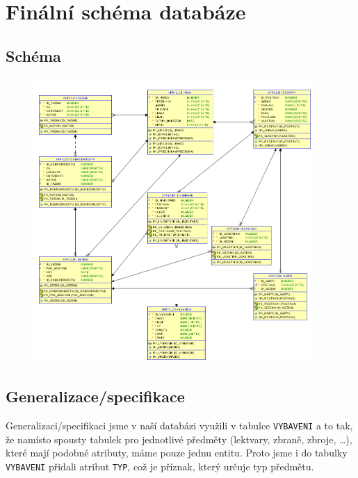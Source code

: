 \documentclass[a4paper, 11pt]{article}
\begin{document}
\pagebreak

\section{Finální schéma databáze}

\subsection{Schéma}

\smallskip

\begin{figure}[h]
	\centering
	\includegraphics[width=0.95\textwidth]{erd}
\end{figure}


\subsection{Generalizace/specifikace}

Generalizaci/specifikaci jsme v naší databázi využili v tabulce \texttt{VYBAVENI} a to tak, že namísto spousty tabulek pro jednotlivé předměty (lektvary, zbraně, zbroje, \dots), které mají podobné atributy, máme pouze jednu entitu. Proto jsme i do tabulky \texttt{VYBAVENI} přidali atribut \texttt{TYP}, což je příznak, který určuje typ předmětu.

\pagebreak
\end{document}
